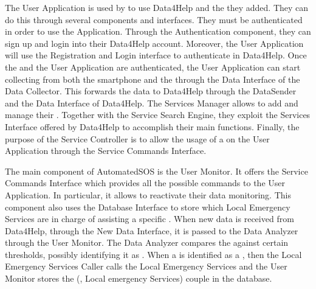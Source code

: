 \documentclass[../../DD.tex]{subfiles}
\begin{document}

	The User Application is used by  to use Data4Help and the  they added. They can do this through several components and interfaces. They must be authenticated in order to use the Application. Through the Authentication component, they can sign up and login into their Data4Help account. Moreover, the User Application will use the Registration and Login interface to authenticate in Data4Help. Once the  and the User Application are authenticated, the User Application can start collecting  from both the smartphone and the  through the Data Interface of the Data Collector. This forwards the data to Data4Help through the DataSender and the Data Interface of Data4Help.
	The Services Manager allows  to add and manage their . Together with the Service Search Engine, they exploit the Services Interface offered by Data4Help to accomplish their main functions.
	Finally, the purpose of the Service Controller is to allow the usage of a  on the User Application through the Service Commands Interface.




	The main component of AutomatedSOS is the User Monitor. It offers the Service Commands Interface which provides all the possible commands to the User Application. In particular, it allows  to reactivate their data monitoring. This component also uses the Database Interface to store which Local Emergency Services are in charge of assisting a specific .
	When new data is received from Data4Help, through the New Data Interface, it is passed to the Data Analyzer through the User Monitor. The Data Analyzer compares the  against certain thresholds, possibly identifying it as . When a  is identified as a , then the Local Emergency Services Caller calls the Local Emergency Services and the User Monitor stores the (, Local emergency Services) couple in the database.

\end{document}
